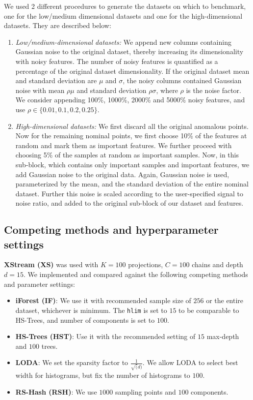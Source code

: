 We used 2 different procedures to generate the datasets on which to benchmark, one for the low/medium dimensional datasets and one for the high-dimensional datasets. They are described below:
\begin{enumerate}
	\item \textit{Low/medium-dimensional datasets:} We append new columns containing Gaussian noise to the original dataset, thereby increasing its dimensionality with noisy features. The number of noisy features is quantified as a percentage of the original dataset dimensionality. If the original dataset mean and standard deviation are $\mu$ and $\sigma$, the noisy columns contained Gaussian noise with mean $\rho\mu$ and standard deviation $\rho\sigma$, where $\rho$ is the noise factor. We consider appending 100\%, 1000\%, 2000\% and 5000\% noisy features, and use $\rho \in \{0.01, 0.1, 0.2, 0.25\}$.

	\item \textit{High-dimensional datasets:} We first discard all the original anomalous points. Now for the remaining nominal points, we first choose 10\% of the features at random and mark them as important features. We further proceed with choosing 5\% of the samples at random as important samples. Now, in this sub-block, which contains only important samples and important features, we add Gaussian noise to the original data. Again, Gaussian noise is used, parameterized by the mean, and the standard deviation of the entire nominal dataset. Further this noise is scaled according to the user-specified signal to noise ratio, and added to the original sub-block of our dataset and features.
\end{enumerate}

\pagebreak

\subsection{Competing methods and hyperparameter settings}

\textbf{XStream (XS)} was used with $K=100$ projections, $C=100$ chains and depth $d=15$. We implemented and compared against the following competing methods and parameter settings:

\begin{itemize}
	\item \textbf{iForest (IF)}: We use it with recommended sample size of $256$ or the entire dataset, whichever is minimum. The \texttt{hlim} is set to $15$ to be comparable to HS-Trees, and number of components is set to $100$.

	\item \textbf{HS-Trees (HST)}:  Use it with the recommended setting of $15$ max-depth and $100$ trees.

	\item \textbf{LODA}: We set the sparsity factor to $\frac{1}{\sqrt(d)}$. We allow LODA to select best width for histograms, but fix the number of histograms to $100$.

	\item \textbf{RS-Hash (RSH)}: We use $1000$ sampling points and $100$ components.
\end{itemize}

